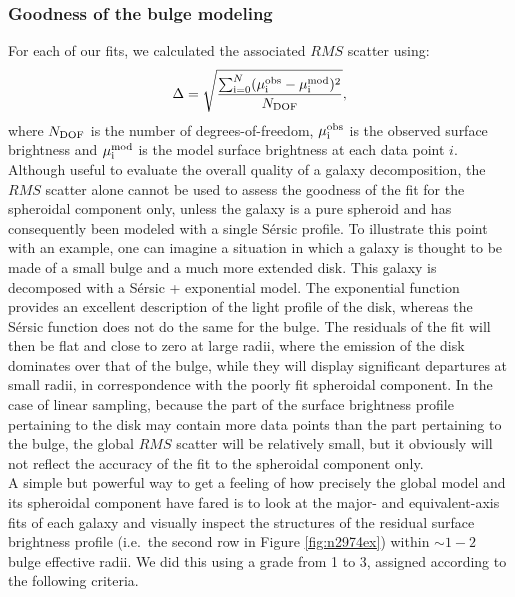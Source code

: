 \documentclass[preprint2]{emulateapj}
\begin{document}
\subsubsection{Goodness of the bulge modeling}
For each of our fits, we calculated the associated $RMS$ scatter using:
\begin{equation}
\Delta = \sqrt{\frac{\sum_{\rm i=0}^{N} (\mu_{\rm i}^{\rm obs} - \mu_{\rm i}^{\rm mod})^2}{N_{\rm DOF}} } ,
\end{equation} 
where $N_{\rm DOF}$ is the number of degrees-of-freedom, 
$\mu_{\rm i}^{\rm obs}$ is the observed surface brightness 
and $\mu_{\rm i}^{\rm mod}$ is the model surface brightness at each data point $i$.
Although useful to evaluate the overall quality of a galaxy decomposition, 
the $RMS$ scatter alone cannot be used to assess the goodness of the fit for the spheroidal component only, 
unless the galaxy is a pure spheroid and has consequently been modeled with a single S\'ersic profile.
To illustrate this point with an example, 
one can imagine a situation in which a galaxy is thought to be made of a small bulge and a much more extended disk.
This galaxy is decomposed with a S\'ersic + exponential model.
The exponential function provides an excellent description of the light profile of the disk, 
whereas the S\'ersic function does not do the same for the bulge.
The residuals of the fit will then be flat and close to zero at large radii, 
where the emission of the disk dominates over that of the bulge,
while they will display significant departures at small radii, 
in correspondence with the poorly fit spheroidal component.
In the case of linear sampling, 
because the part of the surface brightness profile pertaining to the disk may contain more data points 
than the part pertaining to the bulge, 
the global $RMS$ scatter will be relatively small, 
but it obviously will not reflect the accuracy of the fit to the spheroidal component only. \\
A simple but powerful way to get a feeling of how precisely the global model and its spheroidal component have fared
is to look at the major- and equivalent-axis fits of each galaxy 
and visually inspect the structures of the residual surface brightness profile 
(i.e.~the second row in Figure \ref{fig:n2974ex}) within $\sim 1 - 2$ bulge effective radii. 
We did this using a grade from 1 to 3, assigned according to the following criteria.
\end{document}
